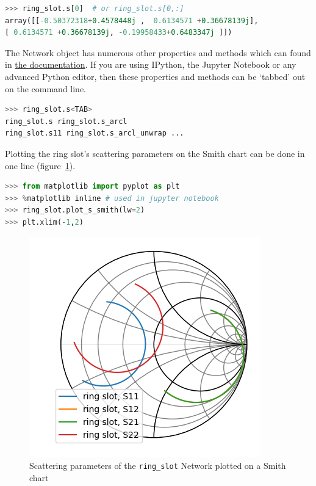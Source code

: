 \documentclass{IEEEjmw}
\begin{document}
\begin{lstlisting}[language=Python]
>>> ring_slot.s[0]  # or ring_slot.s[0,:]
array([[-0.50372318+0.4578448j ,  0.6134571 +0.36678139j],
[ 0.6134571 +0.36678139j, -0.19958433+0.6483347j ]])
\end{lstlisting}

The Network object has numerous other properties and methods which can found in  \href{https://scikit-rf.readthedocs.io}{the documentation}. If you are using IPython\cite{perez2007}, the Jupyter Notebook\cite{granger2021} or any advanced Python editor, then these properties and methods can be ‘tabbed’ out on the command line.

\begin{lstlisting}[language=Python]
>>> ring_slot.s<TAB>
ring_slot.s ring_slot.s_arcl
ring_slot.s11 ring_slot.s_arcl_unwrap ...
\end{lstlisting}

Plotting the ring slot’s scattering parameters on the Smith chart can be done in one line (figure~\ref{fig:figure1}).

\begin{lstlisting}[language=Python]
>>> from matplotlib import pyplot as plt
>>> %matplotlib inline # used in jupyter notebook
>>> ring_slot.plot_s_smith(lw=2)
>>> plt.xlim(-1,2)
\end{lstlisting}

\begin{figure}
	\centering
	\includegraphics[width=0.95\linewidth]{figures/figure1}
	\caption{Scattering parameters of the \texttt{ring\_slot} Network plotted on a Smith chart}
	\label{fig:figure1}
\end{figure}
\end{document}
